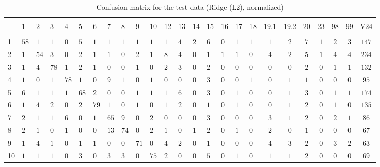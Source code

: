 
\begin{table}[!htbp] \centering 
  \caption{Confusion matrix for the test data (Ridge (L2), normalized)} 
  \label{tab:confusion-ridge} 
\begin{tabularx}{\textwidth}{XXXXXXXXXXXXXXXXXXccccccc} 
\\[-1.8ex]\hline 
\hline \\[-1.8ex] 
 & 1 & 2 & 3 & 4 & 5 & 6 & 7 & 8 & 9 & 10 & 12 & 13 & 14 & 15 & 16 & 17 & 18 & 19.1 & 19.2 & 20 & 23 & 98 & 99 & V24 \\ 
\hline \\[-1.8ex] 
1 & $58$ & $1$ & $1$ & $0$ & $5$ & $1$ & $1$ & $1$ & $1$ & $1$ & $1$ & $4$ & $2$ & $6$ & $0$ & $1$ & $1$ & $1$ & $2$ & $7$ & $1$ & $2$ & $3$ & $147$ \\ 
2 & $1$ & $54$ & $3$ & $0$ & $2$ & $1$ & $1$ & $0$ & $2$ & $1$ & $8$ & $4$ & $0$ & $1$ & $1$ & $1$ & $0$ & $4$ & $2$ & $5$ & $1$ & $4$ & $4$ & $234$ \\ 
3 & $1$ & $4$ & $78$ & $1$ & $2$ & $1$ & $0$ & $0$ & $1$ & $0$ & $2$ & $3$ & $0$ & $2$ & $0$ & $0$ & $0$ & $0$ & $0$ & $2$ & $0$ & $1$ & $1$ & $132$ \\ 
4 & $1$ & $0$ & $1$ & $78$ & $1$ & $0$ & $9$ & $1$ & $0$ & $1$ & $0$ & $0$ & $0$ & $3$ & $0$ & $0$ & $1$ & $0$ & $1$ & $1$ & $0$ & $0$ & $0$ & $95$ \\ 
5 & $6$ & $1$ & $1$ & $1$ & $68$ & $2$ & $0$ & $0$ & $1$ & $1$ & $1$ & $6$ & $0$ & $3$ & $0$ & $1$ & $0$ & $0$ & $1$ & $3$ & $0$ & $1$ & $1$ & $174$ \\ 
6 & $1$ & $4$ & $2$ & $0$ & $2$ & $79$ & $1$ & $0$ & $1$ & $0$ & $1$ & $2$ & $0$ & $1$ & $0$ & $1$ & $0$ & $0$ & $1$ & $2$ & $0$ & $1$ & $0$ & $135$ \\ 
7 & $2$ & $1$ & $1$ & $6$ & $0$ & $1$ & $65$ & $9$ & $0$ & $2$ & $0$ & $0$ & $0$ & $3$ & $0$ & $0$ & $0$ & $3$ & $1$ & $2$ & $0$ & $2$ & $1$ & $86$ \\ 
8 & $2$ & $1$ & $0$ & $1$ & $0$ & $0$ & $13$ & $74$ & $0$ & $2$ & $1$ & $0$ & $1$ & $2$ & $0$ & $1$ & $0$ & $2$ & $0$ & $1$ & $0$ & $0$ & $0$ & $67$ \\ 
9 & $1$ & $4$ & $1$ & $0$ & $1$ & $1$ & $0$ & $0$ & $71$ & $0$ & $4$ & $2$ & $0$ & $1$ & $0$ & $0$ & $0$ & $4$ & $3$ & $2$ & $0$ & $3$ & $2$ & $63$ \\ 
10 & $1$ & $1$ & $1$ & $0$ & $3$ & $0$ & $3$ & $3$ & $0$ & $75$ & $2$ & $0$ & $0$ & $5$ & $0$ & $1$ & $0$ & $1$ & $1$ & $2$ & $0$ & $0$ & $0$ & $69$ \\ 

\end{tabularx}
\end{table}
